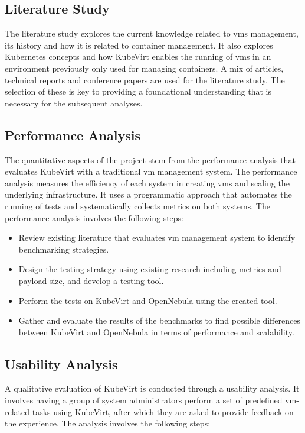 \documentclass{kththesis}
\begin{document}
\subsection{Literature Study}
The literature study explores the current knowledge related to \Glspl{vm} management, its history and how it is related to container management. It also explores Kubernetes concepts and how KubeVirt enables the running of \Glspl{vm} in an environment previously only used for managing containers. A mix of articles, technical reports and conference papers are used for the literature study. The selection of these is key to providing a foundational understanding that is necessary for the subsequent analyses. 

\subsection{Performance Analysis}
The quantitative aspects of the project stem from the performance analysis that evaluates KubeVirt with a traditional \Gls{vm} management system. The performance analysis measures the efficiency of each system in creating \Glspl{vm} and scaling the underlying infrastructure. It uses a programmatic approach that automates the running of tests and systematically collects metrics on both systems. The performance analysis involves the following steps:

\begin{itemize}
    \item Review existing literature that evaluates \Gls{vm} management system to identify benchmarking strategies.
    \item Design the testing strategy using existing research including metrics and payload size, and develop a testing tool.
    \item Perform the tests on KubeVirt and OpenNebula using the created tool.
    \item Gather and evaluate the results of the benchmarks to find possible differences between KubeVirt and OpenNebula in terms of performance and scalability.
\end{itemize}

\subsection{Usability Analysis}
A qualitative evaluation of KubeVirt is conducted through a usability analysis. It involves having a group of system administrators perform a set of predefined \Gls{vm}-related tasks using KubeVirt, after which they are asked to provide feedback on the experience. The analysis involves the following steps:
\end{document}
